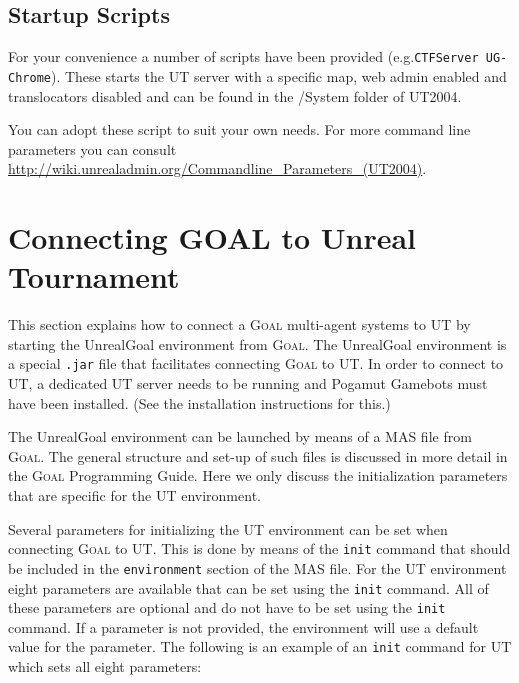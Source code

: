 \documentclass[11pt,a4paper]{article}
\newcommand{\Goal}{\textsc{Goal}}
\begin{document}
\subsection{Startup Scripts}

For your convenience a number of scripts have been provided (e.g.\verb|CTFServer UG-Chrome|). These starts the UT server with a specific map, web admin enabled and translocators disabled and can be found in the /System folder of UT2004.

You can adopt these script to suit your own needs. For more command line parameters you can consult \url{http://wiki.unrealadmin.org/Commandline_Parameters_(UT2004)}.

%
%
%
\section{Connecting GOAL to Unreal Tournament}\label{sec:masspec}
%

This section explains how to connect a {\Goal} multi-agent systems to UT by starting the UnrealGoal environment from {\Goal}. The UnrealGoal environment is a special \texttt{.jar} file that facilitates connecting {\Goal} to UT. In order to connect to UT, a dedicated UT server needs to be running and Pogamut Gamebots must have been installed. (See the installation instructions for this.) %

The UnrealGoal environment can be launched by means of a MAS file from {\Goal}. The general structure and set-up of such files is discussed in more detail in the {\Goal} Programming Guide. Here we only discuss the initialization parameters that are specific for the UT environment.


Several parameters for initializing the UT environment can be set when connecting {\Goal} to UT. This is done by means of the \texttt{init} command that should be included in the \texttt{environment} section of the MAS file. For the UT environment eight parameters are available that can be set using the \texttt{init} command. All of these parameters are optional and do not have to be set using the \texttt{init} command. If a parameter is not provided, the environment will use a default value for the parameter. The following is an example of an \texttt{init} command for UT which sets all eight parameters:
\end{document}
